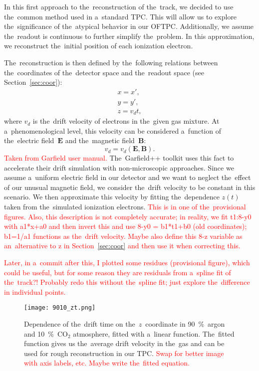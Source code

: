 		In this first approach to the~reconstruction of the~track, we decided to use the~common method used in a~standard \ac{TPC}. This will allow us to explore the~significance of the~atypical behavior in our \ac{OFTPC}. Additionally, we assume the~readout is continuous to further simplify the~problem. In this approximation, we reconstruct the~initial position of each ionization electron.
		
		The~reconstruction is then defined by the~following relations between the~coordinates of the~detector space and the~readout space (see Section~\ref{sec:coor}):
			\begin{eqnarray}
				x = x',\\
				y = y',\\
				z = v_d t,
			\end{eqnarray}
		where $v_d$ is the~drift velocity of electrons in the~given gas mixture. At a~phenomenological level, this velocity can be considered a~function of the~electric field~$\bm{E}$ and the~magnetic field~$\bm{B}$:
			\begin{equation}
				v_d = v_d(\bm{E},\bm{B}).
			\end{equation}
		\textcolor{red}{Taken from Garfield user manual.} The~Garfield++ toolkit uses this fact to accelerate their drift simulation with non-microscopic approaches. Since we assume a~uniform electric field in our detector and we want to neglect the~effect of our unusual magnetic field, we consider the~drift velocity to be constant in this scenario. We then approximate this velocity by fitting the~dependence $z(t)$ taken from the~simulated ionization electrons. \textcolor{red}{This is in one of the~provisional figures. Also, this description is not completely accurate; in reality, we fit t1:8-y0 with a1*x+a0 and then invert this and use 8-y0 = b1*t1+b0 (old coordinates); b1=1/a1 functions as the~drift velocity. Maybe also define this 8-z variable as an~alternative to z in Section~\ref{sec:coor} and then use it when correcting this.}
		
		\textcolor{red}{Later, in a~commit after this, I plotted some residues (provisional figure), which could be useful, but for some reason they are residuals from a~spline fit of the~track?! Probably redo this without the~spline fit; just explore the~difference in individual points.}
		
		\begin{figure}
			\centering
			\texttt{[image: 9010\_zt.png]}
			\caption{Dependence of the~drift time on the~$z$~coordinate in 90~\%~argon and 10~\%~CO$_2$ atmosphere, fitted with a~linear function. The~fitted function gives us the~average drift velocity in the~gas and can be used for rough reconstruction in our \ac{TPC}. \textcolor{red}{Swap for better image with axis labels, etc. Maybe write the~fitted equation.}}
			\label{fig:9010zt}
		\end{figure}
		
